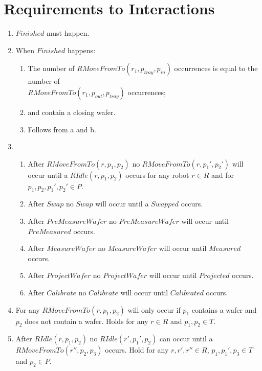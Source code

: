 \section{Requirements to Interactions}\label{sec:req2int}

\begin{enumerate}
    \item $\mathit{Finished}$ must happen.

    \item When $\mathit{Finished}$ happens:
    \begin{enumerate}
        \item The number of $\mathit{RMoveFromTo}(r_1, p_\mathit{tray}, p_\mathit{in})$ occurrences is equal to the number of \\$\mathit{RMoveFromTo}(r_1, p_\mathit{out}, p_\mathit{tray})$ occurrences;
        \item \chuckMeas and \chuckProj contain a closing wafer.
        \item Follows from a and b.
    \end{enumerate}

    \item \begin{enumerate}
        \item After $\mathit{RMoveFromTo}(r, p_1, p_2)$ no $\mathit{RMoveFromTo}(r, p_1', p_2')$ will occur until a $\mathit{RIdle}(r, p_1,p_2)$ occurs for any robot $r \in R$ and for $p_1, p_2, p_1',p_2' \in P$.
        \item After $\mathit{Swap}$ no $\mathit{Swap}$ will occur until a $\mathit{Swapped}$ occurs.
        \item After $\mathit{PreMeasureWafer}$ no $\mathit{PreMeasureWafer}$ will occur until $\mathit{PreMeasured}$ occurs.
        \item After $\mathit{MeasureWafer}$ no $\mathit{MeasureWafer}$ will occur until $\mathit{Measured}$ occurs.
        \item After $\mathit{ProjectWafer}$ no $\mathit{ProjectWafer}$ will occur until $\mathit{Projected}$ occurs.
        \item After $\mathit{Calibrate}$ no $\mathit{Calibrate}$ will occur until $\mathit{Calibrated}$ occurs.
    \end{enumerate}

    \item For any $RMoveFromTo(r, p_1, p_2)$ will only occur if $p_1$ contains a wafer and $p_2$ does not contain a wafer. Holds for any $r \in R$ and $p_1,p_2 \in T$.
    \item After $RIdle(r, p_1, p_2)$ no $RIdle(r', p_1', p_2)$ can occur until a $RMoveFromTo(r'',p_2,p_3)$ occurs. Hold for any $r, r',r''\in R$, $p_1,p_1',p_3 \in T$ and $p_2 \in P$.


\end{enumerate}

